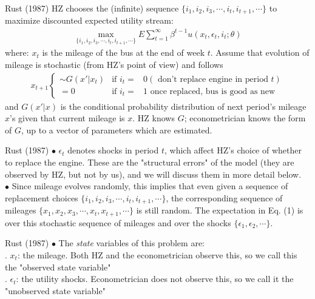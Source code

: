 \documentclass[xcolor=pdftex,dvipsnames,table,mathserif]{beamer}
\begin{document}
\begin{frame}{Rust (1987)}
HZ chooses the (infinite) sequence $\{i_1, i_2, i_3, \cdots, i_t, i_{t+1}, \cdots \}$ to maximize discounted expected utility stream:
\begin{eqnarray*}
\max_{\{i_1, i_2, i_3, \cdots, i_t, i_{t+1}, \cdots \}} E \sum^{\infty}_{t=1} \beta^{t-1} u (x_t, \epsilon_t, i_t; \theta)
\end{eqnarray*}
where: $x_t$ is the mileage of the bus at the end of week $t$. Assume that evolution of mileage is stochastic (from HZ's point of view) and follows
\begin{eqnarray*}
x_{t+1} \left \{ \begin{matrix} \sim G(x' | x_t) &\text{if } i_t =& 0 (\text{ don't replace engine in period } t) \\
= 0 &\text{if } i_t =& 1\text{ once replaced, bus is good as new} \end{matrix} \right .
\end{eqnarray*}
and $G(x' | x)$ is the conditional probability distribution of next period's mileage $x$'s given that current mileage is $x$. HZ knows $G$; econometrician knows the form of $G$, up to a vector of parameters which are estimated. 
\end{frame}


\begin{frame}{Rust (1987)}
$\bullet$ $\epsilon_t$ denotes shocks in period $t$, which affect HZ's choice of whether to replace the engine. These are the "structural errors" of the model (they are observed by HZ, but not by us), and we will discuss them in more detail below. \\
\vspace{3mm}
$\bullet$ Since mileage evolves randomly, this implies that even given a sequence of replacement choices $\{ i_1, i_2, i_3, \cdots , i_t, i_{t+1}, \cdots \}$, the corresponding sequence of mileages $\{x_1, x_2, x_3, \cdots, x_t, x_{t+1}, \cdots \}$ is still random. The expectation in Eq. (1) is over this stochastic sequence of mileages and over the shocks $\{\epsilon_1, \epsilon_2, \cdots \}$. 
\end{frame} 

\begin{frame}{Rust (1987)}
$\bullet$ The \emph{state} variables of this problem are: \\
\vspace{3mm}
. $x_t$: the mileage. Both HZ and the econometrician observe this, so we call this the "observed state variable" \\
\vspace{3mm}
. $\epsilon_t$: the utility shocks. Econometrician does not observe this, so we call it the "unobserved state variable"
\end{frame}
\end{document}
